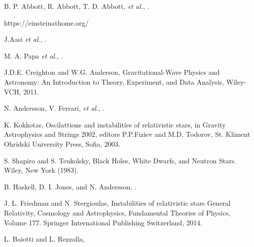 B. P. Abbott, R. Abbott, T. D. Abbott, \textit{et al.}, . 



https://einsteinathome.org/

J.Aasi \textit{et al.}, .

M. A. Papa \textit{et al.}, .

J.D.E. Creighton and W.G. Anderson, Gravitational-Wave Physics and Astronomy: An Introduction
to Theory, Experiment, and Data Analysis, Wiley-VCH, 2011.

N. Andersson, V. Ferrari, \textit{et al.}, . 

K. Kokkotas, Oscilattions and instabilities of relativistic stars, in Gravity Astrophysics and 
Strings 2002, editors P.P.Fiziev and M.D. Todorov, St. Kliment Ohridski University Press, Sofia, 2003.

S. Shapiro and S. Teukolsky, Black Holes, White Dwarfs, and Neutron Stars. Wiley, New York (1983).

B. Haskell, D. I. Jones, and N. Andersson, .

J. L. Friedman and N. Stergioulas, Instabilities of relativistic stars
General Relativity, Cosmology and Astrophysics, Fundamental Theories of Physics, Volume 177. 
Springer International Publishing Switzerland, 2014.

L. Baiotti and L. Rezzolla, 

